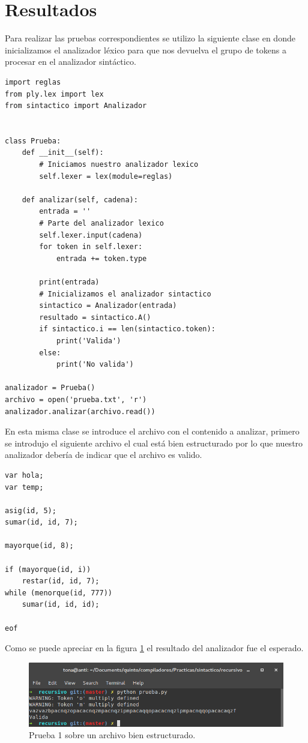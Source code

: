 \documentclass[12pt, titlepage]{article}
\begin{document}
\section{Resultados}
Para realizar las pruebas correspondientes se utilizo la siguiente clase en 
donde inicializamos el analizador léxico para que nos devuelva el grupo de 
tokens a procesar en el analizador sintáctico.
\begin{lstlisting}
import reglas
from ply.lex import lex
from sintactico import Analizador


class Prueba:
    def __init__(self):
        # Iniciamos nuestro analizador lexico
        self.lexer = lex(module=reglas)

    def analizar(self, cadena):
        entrada = ''
        # Parte del analizador lexico
        self.lexer.input(cadena)
        for token in self.lexer:
            entrada += token.type

        print(entrada)
        # Inicializamos el analizador sintactico
        sintactico = Analizador(entrada)
        resultado = sintactico.A()
        if sintactico.i == len(sintactico.token):
            print('Valida')
        else:
            print('No valida')

analizador = Prueba()
archivo = open('prueba.txt', 'r')
analizador.analizar(archivo.read())
\end{lstlisting}
En esta misma clase se introduce el archivo con el contenido a analizar, 
primero se introdujo el siguiente archivo el cual está bien estructurado por lo 
que nuestro analizador debería de indicar que el archivo es valido.
\begin{lstlisting}
var hola;
var temp;

asig(id, 5);
sumar(id, id, 7);

mayorque(id, 8);

if (mayorque(id, i))
    restar(id, id, 7);
while (menorque(id, 777))
    sumar(id, id, id);

eof
\end{lstlisting}
Como se puede apreciar en la figura \ref{fig:prueba1} el resultado del 
analizador fue el esperado.
\begin{figure}[H]
    \begin{center}
    \includegraphics[width=15cm]{prueba1.png}
    \caption{Prueba 1 sobre un archivo bien estructurado.}
    \label{fig:prueba1}
    \end{center}
\end{figure}
\end{document}
